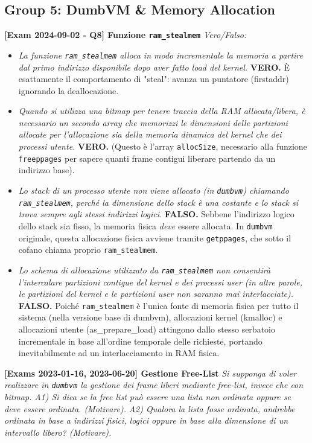 \newpage
\subsection*{Group 5: DumbVM \& Memory Allocation}

\textbf{[Exam 2024-09-02 - Q8] Funzione \texttt{ram\_stealmem}}
\textit{Vero/Falso:}
\begin{itemize}
    \item \textit{La funzione \texttt{ram\_stealmem} alloca in modo incrementale la memoria a partire dal primo indirizzo disponibile dopo aver fatto load del kernel.} \textbf{VERO.} È esattamente il comportamento di "steal": avanza un puntatore (firstaddr) ignorando la deallocazione.
    \item \textit{Quando si utilizza una bitmap per tenere traccia della RAM allocata/libera, è necessario un secondo array che memorizzi le dimensioni delle partizioni allocate per l’allocazione sia della memoria dinamica del kernel che dei processi utente.} \textbf{VERO.} (Questo è l'array \texttt{allocSize}, necessario alla funzione \texttt{freeppages} per sapere quanti frame contigui liberare partendo da un indirizzo base).
    \item \textit{Lo stack di un processo utente non viene allocato (in \texttt{dumbvm}) chiamando \texttt{ram\_stealmem}, perché la dimensione dello stack è una costante e lo stack si trova sempre agli stessi indirizzi logici.} \textbf{FALSO.} Sebbene l'indirizzo logico dello stack sia fisso, la memoria fisica \textit{deve} essere allocata. In \texttt{dumbvm} originale, questa allocazione fisica avviene tramite \texttt{getppages}, che sotto il cofano chiama proprio \texttt{ram\_stealmem}.
    \item \textit{Lo schema di allocazione utilizzato da \texttt{ram\_stealmem} non consentirà l’intercalare partizioni contigue del kernel e dei processi user (in altre parole, le partizioni del kernel e le partizioni user non saranno mai interlacciate).} \textbf{FALSO.} Poiché \texttt{ram\_stealmem} è l'unica fonte di memoria fisica per tutto il sistema (nella versione base di dumbvm), allocazioni kernel (kmalloc) e allocazioni utente (as\_prepare\_load) attingono dallo stesso serbatoio incrementale in base all'ordine temporale delle richieste, portando inevitabilmente ad un interlacciamento in RAM fisica.
\end{itemize}

\vspace{1em}

\textbf{[Exams 2023-01-16, 2023-06-20] Gestione Free-List}
\textit{Si supponga di voler realizzare in \texttt{dumbvm} la gestione dei frame liberi mediante free-list, invece che con bitmap.}
\textit{A1) Si dica se la free list può essere una lista non ordinata oppure se deve essere ordinata. (Motivare).}
\textit{A2) Qualora la lista fosse ordinata, andrebbe ordinata in base a indirizzi fisici, logici oppure in base alla dimensione di un intervallo libero? (Motivare).}

